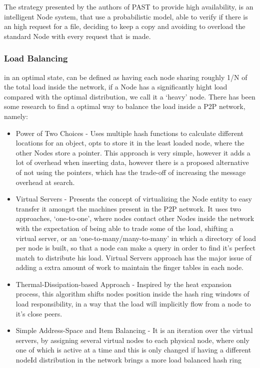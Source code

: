 The strategy presented by the authors of PAST to provide high availability, is an intelligent Node system, that use a probabilistic model, able to verify if there is an high request for a file, deciding to keep a copy and avoiding to overload the standard Node with every request that is made.

\subsubsection{Load Balancing}\label{par:load_balancing}

in an optimal state, can be defined as having each node sharing roughly 1/N of the total load inside the network, if a Node has a significantly hight load compared with the optimal distribution, we call it a `heavy' node. There has been some research to find a optimal way to balance the load inside a P2P network, namely:

\begin{itemize}
   \item Power of Two Choices\cite{Byers} - Uses multiple hash functions to calculate different locations for an object, opts to store it in the least loaded node, where the other Nodes store a pointer. This approach is very simple, however it adds a lot of overhead when inserting data, however there is a proposed alternative of not using the pointers, which has the trade-off of increasing the message overhead at search.
   \item Virtual Servers\cite{Rao2003} - Presents the concept of virtualizing the Node entity to easy transfer it amongst the machines present in the P2P network. It uses two approaches, `one-to-one', where nodes contact other Nodes inside the network with the expectation of being able to trade some of the load, shifting a virtual server, or an `one-to-many/many-to-many' in which a directory of load per node is built, so that a node can make a query in order to find it's perfect match to distribute his load. Virtual Servers approach has the major issue of adding a extra amount of work to maintain the finger tables in each node.
   \item Thermal-Dissipation-based Approach\cite{Rieche} - Inspired by the heat expansion process, this algorithm shifts nodes position inside the hash ring windows of load responsibility, in a way that the load will implicitly flow from a node to it's close peers.
   \item Simple Address-Space and Item Balancing\cite{Karger2004} - It is an iteration over the virtual servers, by assigning several virtual nodes to each physical node, where only one of which is active at a time and this is only changed if having a different nodeId distribution in the network brings a more load balanced hash ring
 \end{itemize} 

